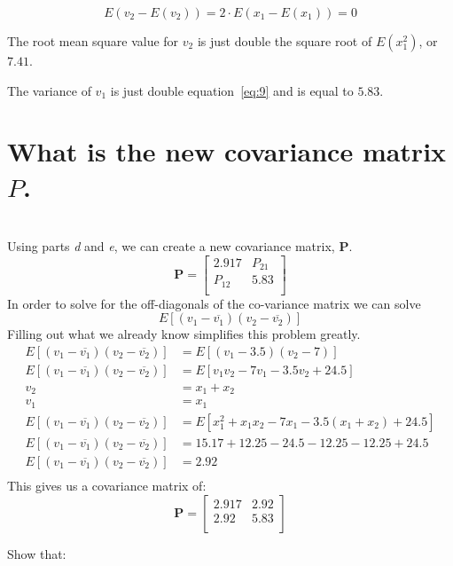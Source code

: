 \documentclass[12pt,letterpaper, onecolumn]{exam}
\begin{document}
\begin{questions}
\begin{parts}
		\begin{equation}
			E(v_2 - E(v_2)) = 2\cdot E(x_1 - E(x_1)) = 0
		\end{equation}

		The root mean square value for $v_2$ is just double the square root of $E(x_1^2)$, or $7.41$.

		The variance of $v_1$ is just double equation~\ref{eq:9} and is equal to $5.83$.
		\part{What is the new covariance matrix $P$.}\\
		\solution
		Using parts \textit{d} and \textit{e}, we can create a new covariance matrix, $\mathbf{P}$.
		\begin{equation}
			\mathbf{P} =
			\begin{bmatrix}
				2.917  & P_{21} \\
				P_{12} & 5.83   \\
			\end{bmatrix}
		\end{equation}
		In order to solve for the off-diagonals of the co-variance matrix we can solve
		\[E\left[(v_1 - \overline{v_1})(v_2 - \overline{v_2}) \right] \]
		Filling out what we already know simplifies this problem greatly.
		\begin{equation}
			\begin{split}
				E\left[(v_1 - \overline{v_1})(v_2 - \overline{v_2}) \right] & = E\left[(v_1 - 3.5)(v_2 - 7) \right]\\
				E\left[(v_1 - \overline{v_1})(v_2 - \overline{v_2}) \right] & = E\left[v_1v_2 - 7v_1 - 3.5v_2 + 24.5\right]\\
				v_2 & = x_1 + x_2\\
				v_1 & = x_1\\
				E\left[(v_1 - \overline{v_1})(v_2 - \overline{v_2}) \right] & = E\left[x_1^2 + x_1x_2 - 7x_1 - 3.5(x_1 + x_2) + 24.5\right]\\
				E\left[(v_1 - \overline{v_1})(v_2 - \overline{v_2}) \right] & = 15.17 + 12.25 - 24.5 - 12.25 - 12.25 + 24.5\\
				E\left[(v_1 - \overline{v_1})(v_2 - \overline{v_2}) \right] & = 2.92\\
			\end{split}
		\end{equation}
		This gives us a covariance matrix of:
		\begin{equation}
			\mathbf{P} =
			\begin{bmatrix}
				2.917 & 2.92 \\
				2.92  & 5.83 \\
			\end{bmatrix}
		\end{equation}
	\end{parts}
	\clearpage
	 Show that:
	\begin{parts}

\end{parts}
\end{questions}
\end{document}
